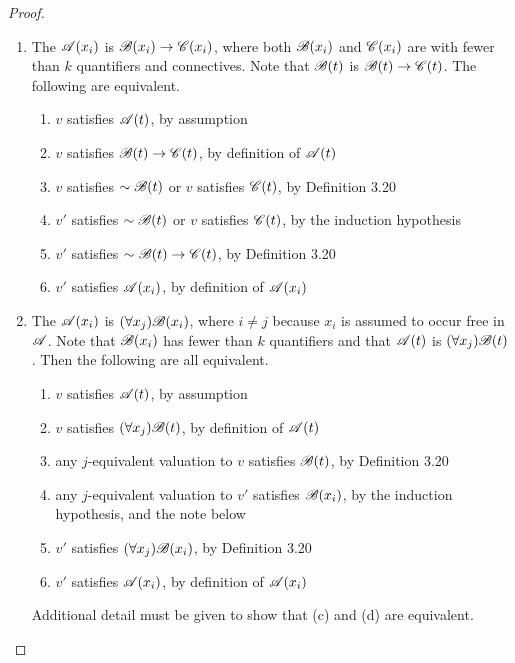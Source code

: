 \begin{proposition}
\begin{proof}
\begin{enumerate}
        \item The \wf{} \(\mathscr{A}(x_i)\) is \(\mathscr{B}(x_i) \rightarrow \mathscr{C}(x_i)\), where both \(\mathscr{B}(x_i)\) and \(\mathscr{C}(x_i)\) are \wfs{} with fewer than \(k\) quantifiers and connectives. Note that \(\mathscr{B}(t)\) is \(\mathscr{B}(t) \rightarrow \mathscr{C}(t)\). The following are equivalent.
          \begin{enumerate}
            \item \(v\) satisfies \(\mathscr{A}(t)\), by assumption
            \item \(v\) satisfies \(\mathscr{B}(t) \rightarrow \mathscr{C}(t)\), by definition of \(\mathscr{A}(t)\)
            \item \(v\) satisfies \(\sim\mathscr{B}(t)\) or \(v\) satisfies \(\mathscr{C}(t)\), by Definition 3.20
            \item \(v'\) satisfies \(\sim\mathscr{B}(t)\) or \(v\) satisfies \(\mathscr{C}(t)\), by the induction hypothesis
            \item \(v'\) satisfies \(\sim\mathscr{B}(t) \rightarrow \mathscr{C}(t)\), by Definition 3.20
            \item \(v'\) satisfies \(\mathscr{A}(x_i)\), by definition of \(\mathscr{A}(x_i)\)
          \end{enumerate}

        \item The \wf{} \(\mathscr{A}(x_i)\) is \((\forall x_j)\mathscr{B}(x_i)\), where \(i \neq j\) because \(x_i\) is assumed to occur free in \(\mathscr{A}\). Note that \(\mathscr{B}(x_i)\) has fewer than \(k\) quantifiers and that \(\mathscr{A}(t)\) is \((\forall x_j)\mathscr{B}(t)\). Then the following are all equivalent.
          \begin{enumerate}
            \item \(v\) satisfies \(\mathscr{A}(t)\), by assumption
            \item \(v\) satisfies \((\forall x_j)\mathscr{B}(t)\), by definition of \(\mathscr{A}(t)\)
            \item any \(j\)-equivalent valuation to \(v\) satisfies \(\mathscr{B}(t)\), by Definition 3.20
            \item any \(j\)-equivalent valuation to \(v'\) satisfies \(\mathscr{B}(x_i)\), by the induction hypothesis, and the note below
            \item \(v'\) satisfies \((\forall x_j)\mathscr{B}(x_i)\), by Definition 3.20
            \item \(v'\) satisfies \(\mathscr{A}(x_i)\), by definition of \(\mathscr{A}(x_i)\)
          \end{enumerate}
          Additional detail must be given to show that (c) and (d) are equivalent.


\end{enumerate}
\end{proof}
\end{proposition}
